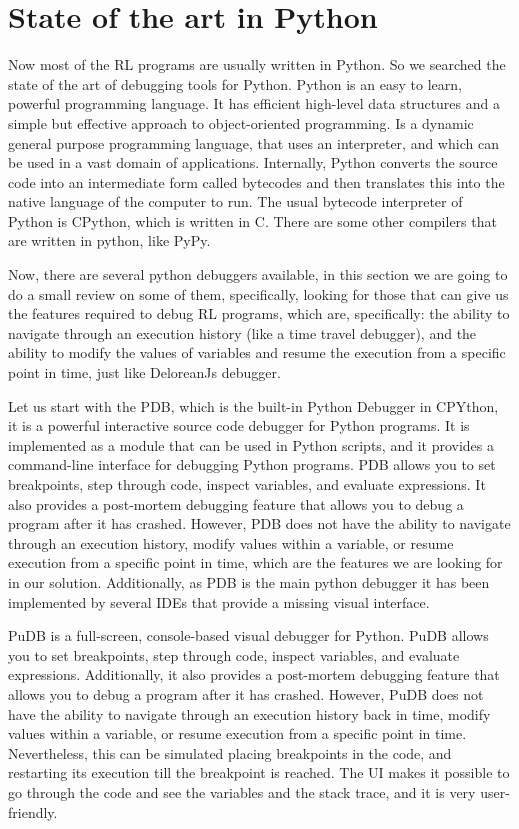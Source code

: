 \section{State of the art in Python}
\label{sec:py}
Now most of the \ac{RL} programs are usually written in Python. So we searched the state 
of the art of debugging tools for Python. Python is an easy to learn, 
powerful programming language. It has efficient high-level data structures and a simple 
but effective approach to object-oriented programming. Is a dynamic general purpose 
programming language, that uses an interpreter, and which can be used in a vast domain 
of applications\cite{10.5555/2846189}. Internally, Python converts the source code 
into an intermediate form called bytecodes and then translates this into the native 
language of the computer to run. The usual bytecode interpreter of Python 
is CPython\cite{shaw2021cpython}, which is written in C. There are some 
other compilers that are written in python, like PyPy.

Now, there are several python debuggers available, in this section we are going to do a 
small review on some of them, specifically, looking for those that can give us the features 
required to debug \ac{RL} programs, which are, specifically: the ability to navigate through
an execution history (like a time travel debugger), and the ability to modify the values
of variables and resume the execution from a specific point in time, just like 
DeloreanJs\cite{delorean23} debugger.

Let us start with the \ac{PDB}\cite{python-pdb}, which is the built-in Python Debugger in CPYthon, it is a 
powerful interactive source code debugger for Python programs. It is implemented as a 
module that can be used in Python scripts, and it provides a command-line interface 
for debugging Python programs. \ac{PDB} allows you to set breakpoints, step through 
code, inspect variables, and evaluate expressions. It also provides a post-mortem 
debugging feature that allows you to debug a program after it has crashed. However, 
\ac{PDB} does not have the ability to navigate through an execution history, modify 
values within a variable, or resume execution from a specific point in time, which 
are the features we are looking for in our solution. Additionally, as \ac{PDB} is the main 
python debugger it has been implemented by several IDEs that provide a missing visual 
interface.

PuDB \cite{pudb}is a full-screen, console-based visual 
debugger for Python. PuDB allows you to set breakpoints, step through code, inspect 
variables, and evaluate expressions. Additionally, it also provides a post-mortem debugging feature 
that allows you to debug a program after it has crashed. However, PuDB does not 
have the ability to navigate through an execution history back in time, modify values 
within a variable, or resume execution from a specific point in time. Nevertheless, this 
can be simulated placing breakpoints in the code, and restarting its execution till the 
breakpoint is reached. The UI makes it possible to go through the code and see the 
variables and the stack trace, and it is very user-friendly.

